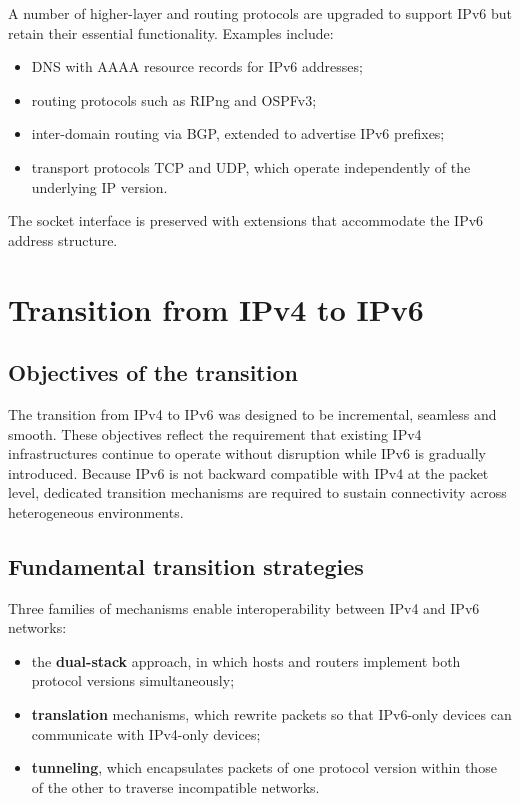 A number of higher-layer and routing protocols are upgraded to support IPv6 but retain their essential functionality. Examples include:

\begin{itemize}
\item DNS with AAAA resource records for IPv6 addresses;
\item routing protocols such as RIPng and OSPFv3;
\item inter-domain routing via BGP, extended to advertise IPv6 prefixes;
\item transport protocols TCP and UDP, which operate independently of the underlying IP version.
\end{itemize}

The socket interface is preserved with extensions that accommodate the IPv6 address structure.

\section{Transition from IPv4 to IPv6}

\subsection{Objectives of the transition}

The transition from IPv4 to IPv6 was designed to be incremental, seamless and smooth. These objectives reflect the requirement that existing IPv4 infrastructures continue to operate without disruption while IPv6 is gradually introduced. Because IPv6 is not backward compatible with IPv4 at the packet level, dedicated transition mechanisms are required to sustain connectivity across heterogeneous environments.

\subsection{Fundamental transition strategies}

Three families of mechanisms enable interoperability between IPv4 and IPv6 networks:

\begin{itemize}
\item the \textbf{dual-stack} approach, in which hosts and routers implement both protocol versions simultaneously;
\item \textbf{translation} mechanisms, which rewrite packets so that IPv6-only devices can communicate with IPv4-only devices;
\item \textbf{tunneling}, which encapsulates packets of one protocol version within those of the other to traverse incompatible networks.
\end{itemize}

